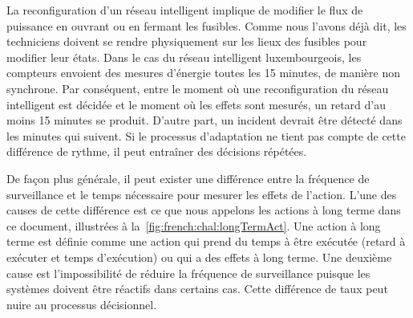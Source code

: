 %
La reconfiguration d'un réseau intelligent implique de modifier le flux de puissance en ouvrant ou en fermant les fusibles. 
Comme nous l'avons déjà dit, les techniciens doivent se rendre physiquement sur les lieux des fusibles pour modifier leur états. 
Dans le cas du réseau intelligent luxembourgeois, les compteurs envoient des mesures d'énergie toutes les 15 minutes, de manière non synchrone. 
Par conséquent, entre le moment où une reconfiguration du réseau intelligent est décidée et le moment où les effets sont mesurés, un retard d'au moins 15 minutes se produit. 
D'autre part, un incident devrait être détecté dans les minutes qui suivent. 
Si le processus d'adaptation ne tient pas compte de cette différence de rythme, il peut entraîner des décisions répétées.

%
De façon plus générale, il peut exister une différence entre la fréquence de surveillance et le temps nécessaire pour mesurer les effets de l'action. 
L'une des causes de cette différence est ce que nous appelons les actions à long terme dans ce document, illustrées à la~\cref{fig:french:chal:longTermAct}. 
Une action à long terme est définie comme une action qui prend du temps à être exécutée (retard à exécuter et temps d'exécution) ou qui a des effets à long terme.
Une deuxième cause est l'impossibilité de réduire la fréquence de surveillance puisque les systèmes doivent être réactifs dans certains cas.
Cette différence de taux peut nuire au processus décisionnel.


